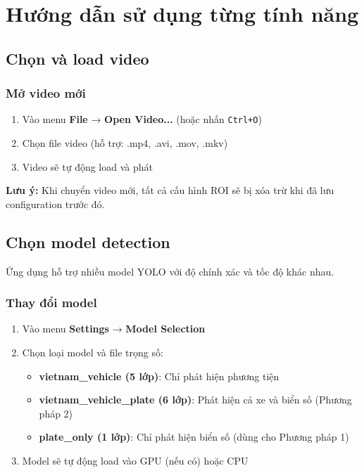 \section{Hướng dẫn sử dụng từng tính năng}

\subsection{Chọn và load video}

\subsubsection{Mở video mới}
\begin{enumerate}
    \item Vào menu \textbf{File} → \textbf{Open Video...} (hoặc nhấn \texttt{Ctrl+O})
    \item Chọn file video (hỗ trợ: .mp4, .avi, .mov, .mkv)
    \item Video sẽ tự động load và phát
\end{enumerate}

\textbf{Lưu ý:} Khi chuyển video mới, tất cả cấu hình ROI sẽ bị xóa trừ khi đã lưu configuration trước đó.

\subsection{Chọn model detection}

Ứng dụng hỗ trợ nhiều model YOLO với độ chính xác và tốc độ khác nhau.

\subsubsection{Thay đổi model}
\begin{enumerate}
    \item Vào menu \textbf{Settings} → \textbf{Model Selection}
    \item Chọn loại model và file trọng số:
    \begin{itemize}
        \item \textbf{vietnam\_vehicle (5 lớp)}: Chỉ phát hiện phương tiện
        \item \textbf{vietnam\_vehicle\_plate (6 lớp)}: Phát hiện cả xe và biển số (Phương pháp 2)
        \item \textbf{plate\_only (1 lớp)}: Chỉ phát hiện biển số (dùng cho Phương pháp 1)
    \end{itemize}
    \item Model sẽ tự động load vào GPU (nếu có) hoặc CPU
\end{enumerate}

